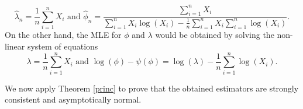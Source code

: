 \documentclass[10pt,a4paper,onecolumn]{article} %
\begin{document}
\begin{equation}\label{verogg21}
\hat\lambda_n=\frac{1}{n}\sum_{i=1}^n{X_i}\mbox{ and }
\hat\phi_n=\frac{\sum_{i=1}^n X_i}{\sum_{i=1}^n X_i \log\left(X_i\right) -\frac{1}{n}\sum_{i=1}^n X_i\sum_{i=1}^n \log\left(X_i\right)}.
\end{equation}
On the other hand, the MLE for $\phi$ and $\lambda$ would be obtained by solving the non-linear system of equations
\begin{equation}\label{verogg23}
\lambda=\frac{1}{n}\sum_{i=1}^n X_i\mbox{ and }\log(\phi)-\psi(\phi)=\log(\lambda)-\frac{1}{n}\sum_{i=1}^n{\log\left(X_i\right)}. 
 \end{equation}

We now apply Theorem \ref{princ} to prove that the obtained estimators are strongly consistent and asymptotically normal.
\end{document}
